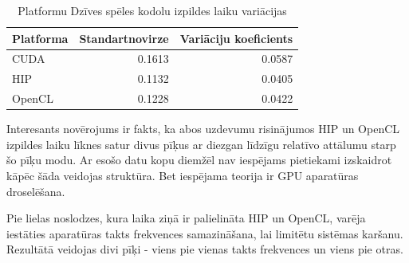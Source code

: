 \begin{table}[H]
    \centering
    \begin{tabular}{lrr}
    \hline
    \textbf{Platforma} & \textbf{Standartnovirze} & \textbf{Variāciju koeficients}\\ \hline
    CUDA    & 0.1613 & 0.0587 \\
    HIP     & 0.1132 & 0.0405  \\
    OpenCL  & 0.1228 & 0.0422 \\
    \hline
    \end{tabular}
    \caption{Platformu Dzīves spēles kodolu izpildes laiku variācijas}
    \label{tab:kernel_exec_time_variations_gol} 
\end{table}


Interesants novērojums ir fakts, ka abos uzdevumu risinājumos HIP un
OpenCL izpildes laiku līknes satur divus pīķus ar diezgan līdzīgu
relatīvo attālumu starp šo pīķu modu. Ar esošo datu kopu diemžēl nav
iespējams pietiekami izskaidrot kāpēc šāda veidojas struktūra. Bet
iespējama teorija ir GPU aparatūras droselēšana.

Pie lielas noslodzes, kura laika ziņā ir palielināta HIP un OpenCL, varēja
iestāties aparatūras takts frekvences samazināšana, lai limitētu sistēmas
karšanu. Rezultātā veidojas divi pīķi - viens pie vienas takts frekvences un
viens pie otras.

